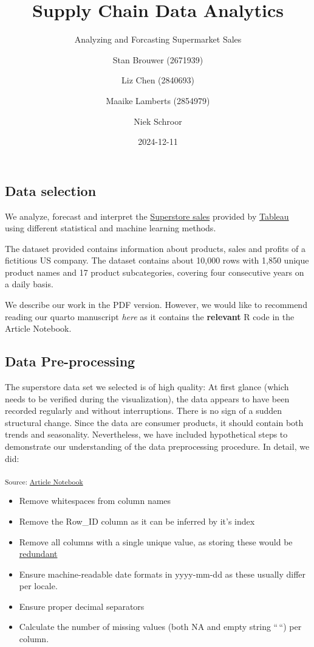 \documentclass[
  letterpaper,
  DIV=11,
  numbers=noendperiod]{scrartcl}
\title{Supply Chain Data Analytics}
\subtitle{Analyzing and Forcasting Supermarket Sales}
\author{Stan Brouwer (2671939) \and Liz Chen (2840693) \and Maaike
Lamberts (2854979) \and Niek Schroor}
\date{2024-12-11}
\providecommand{\tightlist}{%
  \setlength{\itemsep}{0pt}\setlength{\parskip}{0pt}}\usepackage{longtable,booktabs,array}
\begin{document}
\maketitle


\subsection{Data selection}\label{data-selection}

We analyze, forecast and interpret the
\href{https://public.tableau.com/app/sample-data/sample_-_superstore.xls}{Superstore
sales} provided by
\href{https://public.tableau.com/app/learn/sample-data}{Tableau} using
different statistical and machine learning methods.

The dataset provided contains information about products, sales and
profits of a fictitious US company. The dataset contains about 10,000
rows with 1,850 unique product names and 17 product subcategories,
covering four consecutive years on a daily basis.

We describe our work in the PDF version. However, we would like to
recommend reading our quarto manuscript \emph{here} as it contains the
\textbf{relevant} R code in the Article Notebook.

\subsection{Data Pre-processing}\label{data-pre-processing}

The superstore data set we selected is of high quality: At first glance
(which needs to be verified during the visualization), the data appears
to have been recorded regularly and without interruptions. There is no
sign of a sudden structural change. Since the data are consumer
products, it should contain both trends and seasonality. Nevertheless,
we have included hypothetical steps to demonstrate our understanding of
the data preprocessing procedure. In detail, we did:

\textsubscript{Source:
\href{https://SJbrou.github.io/Supply_Chain_Data_Analysis/index.qmd.html}{Article
Notebook}}

\begin{itemize}
\tightlist
\item
  Remove whitespaces from column names
\item
  Remove the Row\_ID column as it can be inferred by it's index
\item
  Remove all columns with a single unique value, as storing these would
  be
  \href{https://few.vu.nl/~molenaar/courses/StatR/chapters/B-06-raw_data.html}{redundant}
\item
  Ensure machine-readable date formats in yyyy-mm-dd as these usually
  differ per locale.
\item
  Ensure proper decimal separators
\item
  Calculate the number of missing values (both NA and empty string
  ``\,``) per column.
\end{itemize}
\end{document}
